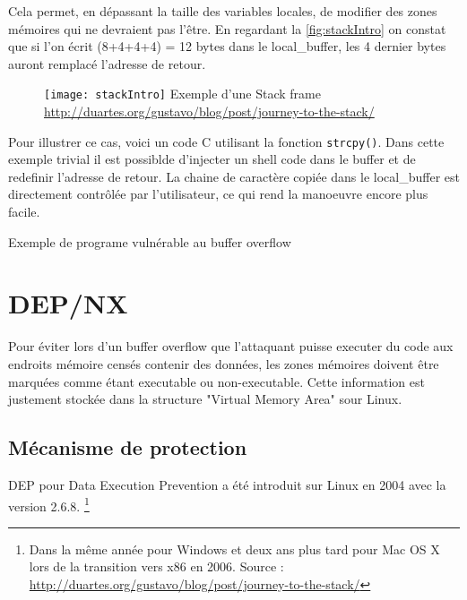 Cela permet, en dépassant la taille des variables locales, de modifier des zones mémoires qui ne devraient pas l'être. En regardant la \autoref{fig:stackIntro} on constat que si l'on écrit (8+4+4+4) = 12 bytes dans le local\_buffer, les 4 dernier bytes auront remplacé l'adresse de retour.

\begin{figure}[H]
	\centering
	\texttt{[image: stackIntro]}
	{Exemple d'une Stack frame}
	{\url{http://duartes.org/gustavo/blog/post/journey-to-the-stack/}}
	\label{fig:stackIntro}
\end{figure}

Pour illustrer ce cas, voici un code C utilisant la fonction \texttt{strcpy()}. Dans cette exemple trivial il est possiblde d'injecter un shell code dans le buffer et de redefinir l'adresse de retour. La chaine de caractère copiée dans le local\_buffer est directement contrôlée par l'utilisateur, ce qui rend la manoeuvre encore plus facile.

\begin{listing}
	\caption{Exemple de programe vulnérable au buffer overflow}
	\label{lst:buffer_overflow}
\end{listing}

\section{DEP/NX}

Pour éviter lors d'un buffer overflow que l'attaquant puisse executer du code aux endroits mémoire censés contenir des données, les zones mémoires doivent être marquées comme étant executable ou non-executable. Cette information est justement stockée dans la structure "Virtual Memory Area" sour Linux.

\subsection{Mécanisme de protection}

DEP pour Data Execution Prevention a été introduit sur Linux en 2004 avec la version 2.6.8. \footnote{Dans la même année pour Windows et deux ans plus tard pour Mac OS X lors de la transition vers x86 en 2006. Source : \url{http://duartes.org/gustavo/blog/post/journey-to-the-stack/}}

